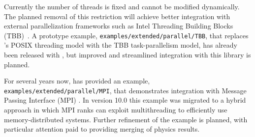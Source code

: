 Currently the number of threads is fixed and cannot be modified dynamically.
The planned removal of this restriction will achieve better integration with 
external parallelization frameworks such as Intel Threading Building Blocks 
(TBB)~\cite{MT:TBB}.  A prototype example,
\verb"examples/extended/parallel/TBB", that replaces \Gfour{}'s POSIX 
threading model with the TBB task-parallelism model, has already been released
with \Gfour{}, but improved and streamlined integration with this library is 
planned.

For several years now, \Gfour{} has provided an example, 
\verb"examples/extended/parallel/MPI", that demonstrates integration
with Message Passing Interface (MPI) \cite{MT:MPI}.  In version 10.0 this
example was migrated to a hybrid approach in which MPI ranks can exploit
multithreading to efficiently use memory-distributed systems.  Further 
refinement of the example is planned, with particular attention paid to 
providing merging of physics results.
